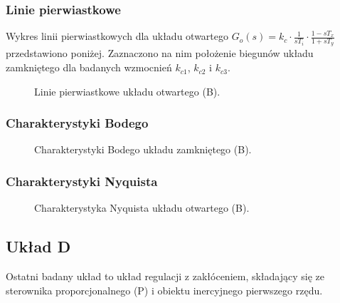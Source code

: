 \documentclass[12pt,a4paper]{article}
\begin{document}
	
	\subsubsection{Linie pierwiastkowe}
	Wykres linii pierwiastkowych dla układu otwartego \(G_o(s) = k_c \cdot \frac{1}{sT_i} \cdot
	\frac{1-sT_x}{1+sT_y}\) przedstawiono poniżej. Zaznaczono na nim położenie biegunów układu zamkniętego dla badanych wzmocnień \(k_{c1}\), \(k_{c2}\) i \(k_{c3}\).
	
	\begin{figure}[H]
		\centering
		\caption{Linie pierwiastkowe układu otwartego (B).}
		\label{fig:rlocus_B}
	\end{figure}
	
	
	\subsubsection{Charakterystyki Bodego}
	
	\begin{figure}[H]
		\centering
		\caption{Charakterystyki Bodego układu zamkniętego (B).}
		\label{fig:bode_B}
	\end{figure}
	
	
	\subsubsection{Charakterystyki Nyquista}
	
	\begin{figure}[H]
		\centering
		\caption{Charakterystyka Nyquista układu otwartego (B).}
		\label{fig:nyquist_B}
	\end{figure}
	
	
	\newpage %
	
	\subsection{Układ D}
	
	Ostatni badany układ to układ regulacji z zakłóceniem, składający się ze sterownika proporcjonalnego (P) i obiektu inercyjnego pierwszego rzędu.
	
\end{document}
